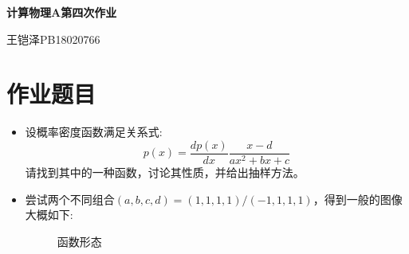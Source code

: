 \documentclass[UTF8]{ctexart}
\begin{document}
	\centering\textbf{\LARGE{计算物理A第四次作业}}
	
	
	王铠泽\qquad PB18020766
	
		
	\section{作业题目}
	
	\begin{itemize}
		\item 设概率密度函数满足关系式:
		$$p(x)=\frac{dp(x)}{dx}\frac{x-d}{ax^2+bx+c}$$
		请找到其中的一种函数，讨论其性质，并给出抽样方法。
		
		\item
		尝试两个不同组合$(a,b,c,d)=(1,1,1,1)/(-1,1,1,1)$，得到一般的图像大概如下:
		
		\begin{figure}[H]
			\centering  %
			
			\caption{函数形态}
			\label{N}
		\end{figure}
		
	\end{itemize}
	
\end{document}
